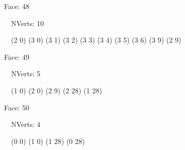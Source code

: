 \documentclass{article}
\begin{document}
{\footnotesize 

Face: 48

\   \    NVerts: 10

 \   \   (2 0) (3 0) (3 1) (3 2) (3 3) (3 4) (3 5) (3 6) (3 9) (2 9)}

{\footnotesize 

Face: 49

\   \    NVerts: 5

 \   \   (1 0) (2 0) (2 9) (2 28) (1 28)}

{\footnotesize 

Face: 50

\   \    NVerts: 4

 \   \   (0 0) (1 0) (1 28) (0 28)}


 \newpage
\end{document}
